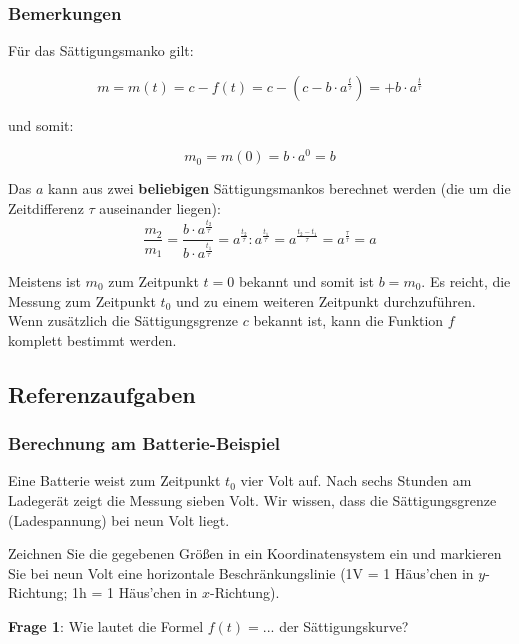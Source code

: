 \subsubsection{Bemerkungen}
\begin{bemerkung}{}{}
  Für das Sättigungsmanko gilt:

$$m = m(t) = c - f(t) = c - \left(c-b\cdot{}a^{\frac{t}{\tau}}\right) = + b\cdot{}a^{\frac{t}{\tau}}$$

und somit:

$$m_0 = m(0) = b\cdot{}a^0 = b$$
\end{bemerkung}

\begin{bemerkung}{}{}
Das $a$ kann aus zwei \textbf{beliebigen} Sättigungsmankos berechnet werden (die um die
Zeitdifferenz $\tau$ auseinander liegen):
$$\frac{m_2}{m_1} = \frac{b\cdot{}a^{\frac{t_2}{\tau}}}{b\cdot{}
  a^{\frac{t_1}{\tau}}} = a^{\frac{t_2}{\tau}} : a^{\frac{t_1}{\tau}} =
a^{\frac{t_2-t_1}{\tau}} = a^{\frac{\tau}{\tau}} = a$$
\end{bemerkung}


\begin{bemerkung}{}{}
Meistens ist $m_0$ zum Zeitpunkt $t=0$ bekannt und somit ist $b=m_0$. Es reicht, die Messung zum Zeitpunkt $t_0$ und zu einem weiteren Zeitpunkt durchzuführen. Wenn zusätzlich die Sättigungsgrenze $c$ bekannt ist, kann die Funktion $f$ komplett bestimmt werden.
\end{bemerkung} 
\newpage

\subsection{Referenzaufgaben}

\subsubsection{Berechnung am Batterie-Beispiel}
Eine Batterie weist zum Zeitpunkt $t_0$ vier Volt auf. Nach sechs Stunden am Ladegerät zeigt die Messung sieben Volt. Wir wissen, dass die Sättigungsgrenze (Ladespannung) bei neun Volt liegt.

Zeichnen Sie die gegebenen Größen in ein Koordinatensystem ein und markieren Sie bei neun Volt eine horizontale Beschränkungslinie (\zB 1V = 1 Häus'chen in $y$-Richtung; 1h = 1 Häus'chen in $x$-Richtung).



\textbf{Frage 1}: Wie lautet die Formel $f(t) = ...$ der Sättigungskurve?


